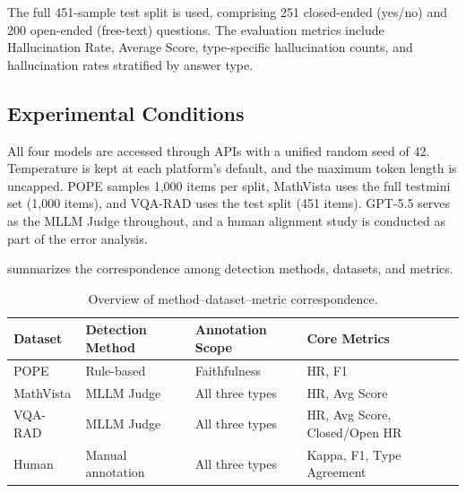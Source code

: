 The full 451-sample test split is used,
comprising 251 closed-ended (yes/no) and 200 open-ended (free-text) questions.
The evaluation metrics include Hallucination Rate, Average Score,
type-specific hallucination counts,
and hallucination rates stratified by answer type.

\subsection{Experimental Conditions}

All four models are accessed through APIs
with a unified random seed of 42.
Temperature is kept at each platform's default,
and the maximum token length is uncapped.
POPE samples 1{,}000 items per split,
MathVista uses the full testmini set (1{,}000 items),
and VQA-RAD uses the test split (451 items).
GPT-5.5 serves as the MLLM Judge throughout,
and a human alignment study is conducted as part of the error analysis.

 summarizes
the correspondence among detection methods, datasets, and metrics.

\begin{table}[htbp]
  \centering
  \caption{Overview of method--dataset--metric correspondence.}
  \label{tab:method_dataset_overview}
  \small
  \begin{tabularx}{\textwidth}{@{}lllX@{}}
    \toprule
    Dataset   & Detection Method  & Annotation Scope    & Core Metrics \\
    \midrule
    POPE      & Rule-based        & Faithfulness        & HR, F1 \\
    MathVista & MLLM Judge        & All three types     & HR, Avg Score \\
    VQA-RAD   & MLLM Judge        & All three types     & HR, Avg Score, Closed/Open HR \\
    \midrule
    \rowcolor{pink!20}
    Human     & Manual annotation & All three types     & Kappa, F1, Type Agreement \\
    \bottomrule
  \end{tabularx}
\end{table}
